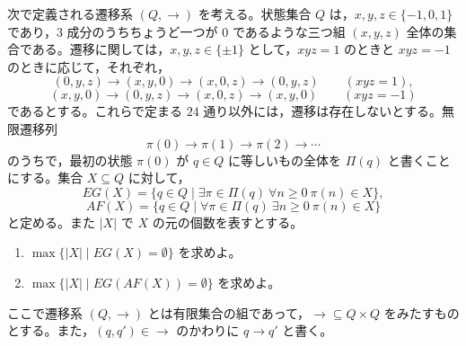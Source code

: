 \documentclass[12pt]{jlreq}
\begin{document}
次で定義される遷移系 \((Q,\to)\) を考える。状態集合 \(Q\) は，\(x,y,z\in\{-1,0,1\}\) であり，\(3\) 成分のうちちょうど一つが \(0\) であるような三つ組 \((x,y,z)\) 全体の集合である。遷移に関しては，\(x,y,z\in\{\pm1\}\) として，\(xyz=1\) のときと \(xyz=-1\) のときに応じて，それぞれ，
\[
  (0,y,z)\to(x,y,0)\to(x,0,z)\to(0,y,z)\qquad (xyz=1),
\]
\[
  (x,y,0)\to(0,y,z)\to(x,0,z)\to(x,y,0)\qquad (xyz=-1)
\]
であるとする。これらで定まる \(24\) 通り以外には，遷移は存在しないとする。無限遷移列
\[
  \pi(0)\to\pi(1)\to\pi(2)\to\cdots
\]
のうちで，最初の状態 \(\pi(0)\) が \(q\in Q\) に等しいもの全体を \(\Pi(q)\) と書くことにする。集合 \(X\subseteq Q\) に対して，
\[
  EG(X)=\{q\in Q\mid \exists\pi\in\Pi(q)\ \forall n\ge0\ \pi(n)\in X\},
\]
\[
  AF(X)=\{q\in Q\mid \forall\pi\in\Pi(q)\ \exists n\ge0\ \pi(n)\in X\}
\]
と定める。また \(|X|\) で \(X\) の元の個数を表すとする。

\begin{enumerate}
  \item \(\max\{|X|\mid EG(X)=\emptyset\}\) を求めよ。
  \item \(\max\{|X|\mid EG(AF(X))=\emptyset\}\) を求めよ。
\end{enumerate}

ここで遷移系 \((Q,\to)\) とは有限集合の組であって，\(\to\subseteq Q\times Q\) をみたすものとする。また，\((q,q')\in\to\) のかわりに \(q\to q'\) と書く。
\end{document}
